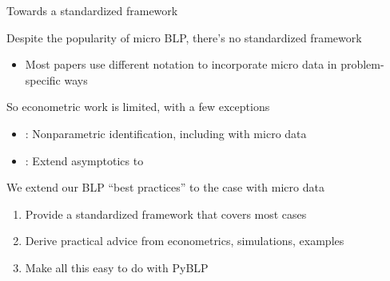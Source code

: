 \begin{frame}{Towards a standardized framework}
    \begin{wideitemize}
        \item Despite the popularity of micro BLP, there's \alert{no standardized framework}
        \begin{itemize}
            \item Most papers use different notation to incorporate micro data in problem-specific ways
        \end{itemize}
                \item So econometric work is limited, with a few exceptions
        \begin{itemize}
            \item \cite{berry2014identification,berry2022nonparametric}: Nonparametric identification, including with micro data
            \item \cite{myojo2012asymptotic}: Extend \cite{berry2004limit} asymptotics to \cite{petrin2002quantifying}
        \end{itemize}
                \item We extend our BLP ``best practices'' \citep{conlon2020best} to the case with micro data
        \begin{enumerate}
            \item Provide a \alert{standardized framework} that covers most cases
            \item Derive \alert{practical advice} from econometrics, simulations, examples
            \item Make all this easy to do with \alert{PyBLP}
        \end{enumerate}
    \end{wideitemize}
\end{frame}


